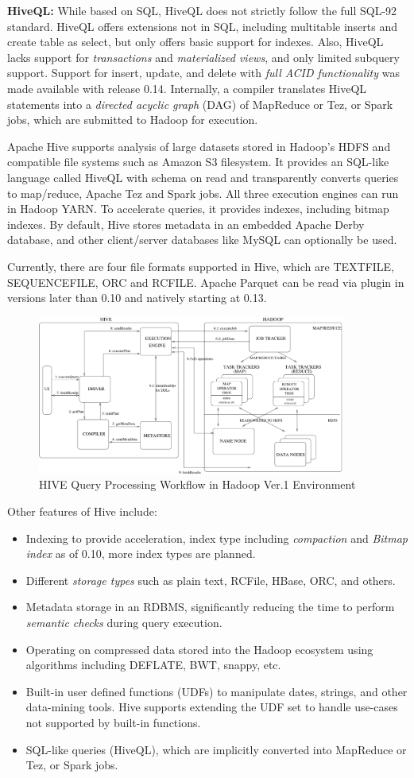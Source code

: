 \documentclass[twocolumn]{article}
\newcommand{\bi}{\begin{itemize}}
\newcommand{\ei}{\end{itemize}}
\newcommand{\ii}{\item}
\begin{document}
\noindent
\textbf{HiveQL:} While based on SQL, HiveQL does not strictly follow the full SQL-92 standard. HiveQL offers extensions not in SQL, including multitable inserts and create table as select, but only offers basic support for indexes. Also, HiveQL lacks support for \textit{transactions} and \textit{materialized views}, and only limited subquery support. Support for insert, update, and delete with \textit{full ACID functionality} was made available with release 0.14.
Internally, a compiler translates HiveQL statements into a \textit{directed acyclic graph} (DAG) of MapReduce or Tez, or Spark jobs, which are submitted to Hadoop for execution.

Apache Hive supports analysis of large datasets stored in Hadoop's HDFS and compatible file systems such as Amazon S3 filesystem. It provides an SQL-like language called HiveQL with schema on read and transparently converts queries to map/reduce, Apache Tez and Spark jobs. All three execution engines can run in Hadoop YARN. To accelerate queries, it provides indexes, including bitmap indexes.
By default, Hive stores metadata in an embedded Apache Derby database, and other client/server databases like MySQL can optionally be used.

Currently, there are four file formats supported in Hive, which are TEXTFILE, SEQUENCEFILE, ORC and RCFILE.
Apache Parquet can be read via plugin in versions later than 0.10 and natively starting at 0.13.

\begin{figure}[htb]
        \centering
        \includegraphics[width=0.9\textwidth]{system_architecture.png}
        \caption{HIVE Query Processing Workflow in Hadoop Ver.1 Environment}
        \label{fig01}
\end{figure}

Other features of Hive include:
\bi
\ii Indexing to provide acceleration, index type including \textit{compaction} and \textit{Bitmap index} as of 0.10, more index types are planned.
\ii Different \textit{storage types} such as plain text, RCFile, HBase, ORC, and others.
\ii Metadata storage in an RDBMS, significantly reducing the time to perform \textit{semantic checks} during query execution.
\ii Operating on compressed data stored into the Hadoop ecosystem using algorithms including DEFLATE, BWT, snappy, etc.
\ii Built-in user defined functions (UDFs) to manipulate dates, strings, and other data-mining tools. Hive supports extending the UDF set to handle use-cases not supported by built-in functions.
\ii SQL-like queries (HiveQL), which are implicitly converted into MapReduce or Tez, or Spark jobs.
\ei
\end{document}
